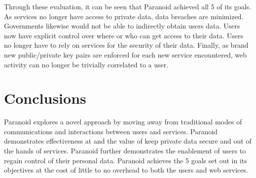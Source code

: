 \documentclass[letterpaper,twocolumn,10pt]{article}
\begin{document}
Through these evaluation, it can be seen that Paranoid achieved all 5 of its goals. As services no longer have access to private data, data breaches are minimized. Governments likewise would not be able to indirectly obtain users data. Users now have explicit control over where or who can get access to their data. Users no longer have to rely on services for the security of their data. Finally, as brand new public/private key pairs are enforced for each new service encountered, web activity can no longer be trivially correlated to a user.

\section{Conclusions}

Paranoid explores a novel approach by moving away from traditional modes of communications and interactions between users and services. Paranoid demonstrates effectiveness at and the value of keep private data secure and out of the hands of services. Paranoid further demonstrates the enablement of users to regain control of their personal data. Paranoid achieves the 5 goals set out in its objectives at the cost of little to no overhead to both the users and web services. 





\end{document}
